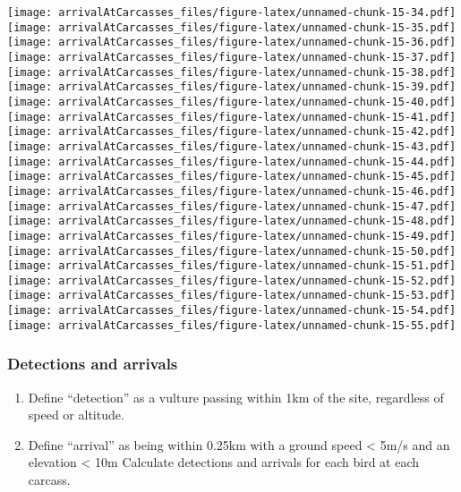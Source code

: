 \documentclass[
]{article}
\providecommand{\tightlist}{%
  \setlength{\itemsep}{0pt}\setlength{\parskip}{0pt}}
\begin{document}
\texttt{[image: arrivalAtCarcasses\_files/figure-latex/unnamed-chunk-15-34.pdf]}
\texttt{[image: arrivalAtCarcasses\_files/figure-latex/unnamed-chunk-15-35.pdf]}
\texttt{[image: arrivalAtCarcasses\_files/figure-latex/unnamed-chunk-15-36.pdf]}
\texttt{[image: arrivalAtCarcasses\_files/figure-latex/unnamed-chunk-15-37.pdf]}
\texttt{[image: arrivalAtCarcasses\_files/figure-latex/unnamed-chunk-15-38.pdf]}
\texttt{[image: arrivalAtCarcasses\_files/figure-latex/unnamed-chunk-15-39.pdf]}
\texttt{[image: arrivalAtCarcasses\_files/figure-latex/unnamed-chunk-15-40.pdf]}
\texttt{[image: arrivalAtCarcasses\_files/figure-latex/unnamed-chunk-15-41.pdf]}
\texttt{[image: arrivalAtCarcasses\_files/figure-latex/unnamed-chunk-15-42.pdf]}
\texttt{[image: arrivalAtCarcasses\_files/figure-latex/unnamed-chunk-15-43.pdf]}
\texttt{[image: arrivalAtCarcasses\_files/figure-latex/unnamed-chunk-15-44.pdf]}
\texttt{[image: arrivalAtCarcasses\_files/figure-latex/unnamed-chunk-15-45.pdf]}
\texttt{[image: arrivalAtCarcasses\_files/figure-latex/unnamed-chunk-15-46.pdf]}
\texttt{[image: arrivalAtCarcasses\_files/figure-latex/unnamed-chunk-15-47.pdf]}
\texttt{[image: arrivalAtCarcasses\_files/figure-latex/unnamed-chunk-15-48.pdf]}
\texttt{[image: arrivalAtCarcasses\_files/figure-latex/unnamed-chunk-15-49.pdf]}
\texttt{[image: arrivalAtCarcasses\_files/figure-latex/unnamed-chunk-15-50.pdf]}
\texttt{[image: arrivalAtCarcasses\_files/figure-latex/unnamed-chunk-15-51.pdf]}
\texttt{[image: arrivalAtCarcasses\_files/figure-latex/unnamed-chunk-15-52.pdf]}
\texttt{[image: arrivalAtCarcasses\_files/figure-latex/unnamed-chunk-15-53.pdf]}
\texttt{[image: arrivalAtCarcasses\_files/figure-latex/unnamed-chunk-15-54.pdf]}
\texttt{[image: arrivalAtCarcasses\_files/figure-latex/unnamed-chunk-15-55.pdf]}

\hypertarget{detections-and-arrivals}{%
\subsubsection{Detections and arrivals}\label{detections-and-arrivals}}

\begin{enumerate}
\def\labelenumi{\arabic{enumi}.}
\tightlist
\item
  Define ``detection'' as a vulture passing within 1km of the site,
  regardless of speed or altitude.
\item
  Define ``arrival'' as being within 0.25km with a ground speed
  \textless{} 5m/s and an elevation \textless{} 10m Calculate detections
  and arrivals for each bird at each carcass.
\end{enumerate}
\end{document}
